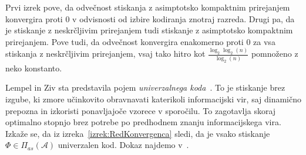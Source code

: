 \documentclass[fin1, tisk]{fmfdelo}
\newcommand{\A}{\mathcal{A}}
\theoremstyle{definition}
\begin{document}
Prvi izrek pove, da odvečnost stiskanja z asimptotsko kompaktnim prirejanjem konvergira proti $0$ v 
odvisnosti od izbire kodiranja znotraj razreda.
Drugi pa, da je stiskanje z neskrčljivim prirejanjem tudi stiskanje z asimptotsko kompaktnim 
prirejanjem. Pove tudi, da odvečnost konvergira enakomerno proti $0$ za vsa stiskanja z neskrčljivim 
prirejanjem, vsaj tako hitro kot $\frac{\log_2 \log_2(n)}{\log_2(n)}$ pomnoženo z neko konstanto.

Lempel in Ziv sta predstavila pojem \emph{univerzalnega koda}~\cite{LempelZiv1977, Ziv1978, LempelZiv1978}.
To je stiskanje brez izgube, ki zmore učinkovito obravnavati katerikoli informacijski vir, saj
dinamično prepozna in izkoristi ponavljajoče vzorece v sporočilu. To zagotavlja skoraj optimalno
stopnjo brez potrebe po predhodnem znanju informacijskega vira. Izkaže se, da iz 
izreka~\ref{izrek:RedKonvergenca} sledi, da je vsako stiskanje $\varPhi \in \varPi_{as}(\A)$ 
univerzalen kod. Dokaz najdemo v~\cite{KiefferYang2000}.
\end{document}
